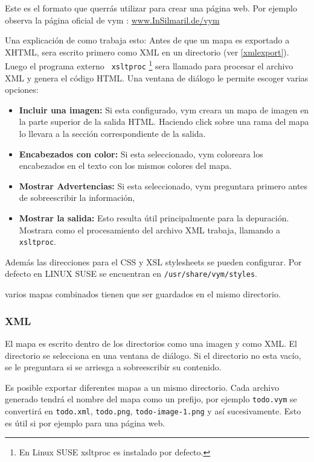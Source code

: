 \documentclass{article}
\newcommand{\vym}{{\sc vym }}
\begin{document}
Este es el formato que querr\'as utilizar para crear una p\'agina web. Por ejemplo observa la p\'agina oficial de \vym:
\href{http://www.InSilmaril.de/vym}{www.InSilmaril.de/vym}

Una explicaci\'on de como trabaja esto: 
Antes de que un mapa es exportado a XHTML, sera escrito primero como XML en un directorio (ver \ref{xmlexport}). Luego el programa externo {\tt
xsltproc} \footnote{En Linux SUSE xsltproc es instalado por defecto.}  
sera llamado para procesar el archivo XML y genera el c\'odigo HTML. Una ventana de di\'alogo le permite escoger varias opciones:
\begin{itemize}
	\item {\bf Incluir una imagen:}  Si esta configurado, \vym creara un mapa de imagen en la parte superior de la salida HTML. Haciendo click sobre una rama del mapa lo llevara a la secci\'on correspondiente de la salida.
	\item {\bf Encabezados con color:}
	Si esta seleccionado, \vym coloreara los encabezados en el texto con los mismos colores del mapa.
	\item {\bf Mostrar Advertencias: }
	Si esta seleccionado, \vym preguntara primero antes de sobreescribir la informaci\'on,
	\item {\bf Mostrar la salida:}
	Esto resulta \'util principalmente para la depuraci\'on. Mostrara como el procesamiento del archivo XML trabaja, llamando a  {\tt xsltproc}.
\end{itemize}
Adem\'as las direcciones para el CSS y XSL stylesheets se pueden configurar. Por defecto en LINUX SUSE se encuentran en
{\tt /usr/share/vym/styles}.


 varios mapas combinados tienen que ser guardados en el mismo directorio.
\subsubsection*{XML} \label{xmlexport}

El mapa es escrito dentro de los directorios como una imagen y como XML. El directorio se selecciona en una ventana de di\'alogo. Si el directorio no esta vac\'io, se le preguntara si se arriesga a sobreescribir su contenido.

Es posible exportar diferentes mapas a un mismo directorio. Cada archivo generado tendr\'a el nombre del mapa como un prefijo, por ejemplo {\tt todo.vym} se convertir\'a en {\tt todo.xml}, {\tt todo.png}, {\tt todo-image-1.png} y as\'i sucesivamente. Esto es \'util si por ejemplo para una p\'agina web.
\end{document}
